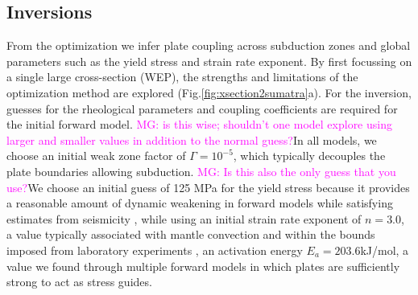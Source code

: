 \documentclass[12pt]{article}
\newcommand{\mgnote}[1]{\textcolor{magenta}{MG: #1}}
\begin{document}
\subsection{Inversions}
From the optimization we infer plate coupling across subduction zones and global parameters such as the yield stress and strain rate exponent. 
By first focussing on a single large cross-section (WEP), the strengths and limitations of the optimization method are explored (Fig.\ref{fig:xsection2sumatra}a).  
For the inversion, guesses for the rheological parameters and coupling coefficients are required for the initial forward model. \mgnote{is this wise; shouldn't one model explore using larger and smaller values in addition to the normal guess?}In all models, we choose an initial weak zone factor of $\Gamma=10^{-5}$, which typically decouples the plate boundaries allowing subduction. \mgnote{Is this also the only guess that you use?}We choose an initial guess of 125 MPa for the yield stress because it provides a reasonable amount of dynamic weakening in forward models while satisfying estimates from seismicity \citep{craig2014reassessment}, while using an initial strain rate exponent of $n=3.0$, a value typically associated with mantle convection and within the bounds imposed from laboratory experiments \citep{ranalli1995rheology}, an activation energy $E_a=203.6$kJ/mol, a value we found through multiple forward models in which plates are sufficiently strong to act as stress guides. %
\end{document}
